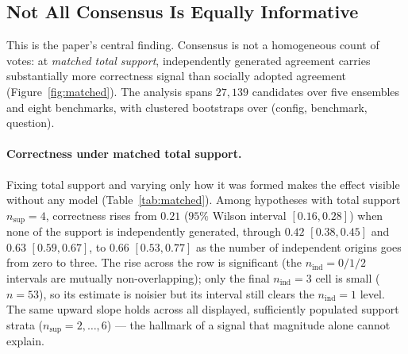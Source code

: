 \subsection{Not All Consensus Is Equally Informative}
\label{subsec:not_all_consensus_equal}

This is the paper's central finding. Consensus is not a homogeneous count of votes: at \emph{matched total
support}, independently generated agreement carries substantially more correctness signal than socially
adopted agreement (Figure~\ref{fig:matched}). The analysis spans $27{,}139$ candidates over five
ensembles and eight benchmarks, with clustered bootstraps over (config, benchmark, question).

\paragraph{Correctness under matched total support.}
\label{par:matched_support_results}
Fixing total support and varying only how it was formed makes the effect visible without any model
(Table~\ref{tab:matched}). Among hypotheses with total support $n_{\mathrm{sup}}=4$, correctness rises
from $0.21$ ($95\%$ Wilson interval $[0.16,0.28]$) when none of the support is independently generated,
through $0.42$ $[0.38,0.45]$ and $0.63$ $[0.59,0.67]$, to $0.66$ $[0.53,0.77]$ as the number of independent
origins goes from zero to three. The rise across the row is significant (the $n_{\mathrm{ind}}{=}0/1/2$
intervals are mutually non-overlapping); only the final $n_{\mathrm{ind}}{=}3$ cell is small ($n=53$), so its
estimate is noisier but its interval still clears the $n_{\mathrm{ind}}{=}1$ level. The same upward slope holds
across all displayed, sufficiently populated support strata ($n_{\mathrm{sup}}=2,\dots,6$) --- the hallmark
of a signal that magnitude alone cannot explain.

